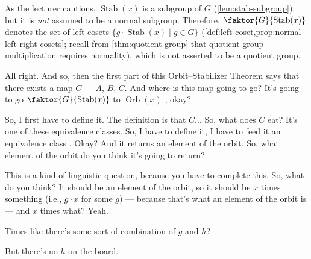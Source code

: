 \begin{insight}
As the lecturer cautions, $\operatorname{Stab}(x)$ is a subgroup of $G$ (\cref{lem:stab-subgroup}), but it is \emph{not} assumed to be a normal subgroup. Therefore, $\faktor{G}{\operatorname{Stab}(x)}$ denotes the set of left cosets $\{ g \cdot \operatorname{Stab}(x) \mid g \in G \}$ (\cref{def:left-coset,prop:normal-left-right-cosets}; recall from \cref{thm:quotient-group} that quotient group multiplication requires normality), which is not asserted to be a quotient group.
\end{insight}

\begin{speech}[00:24:49 - 00:25:53]
All right. And so, then the first part of this Orbit--Stabilizer Theorem says that there exists a map $C$  --- $A$, $B$, $C$. And where is this map going to go? It's going to go $\faktor{G}{\operatorname{Stab}(x)}$ to $\operatorname{Orb}(x)$ , okay?

So, I first have to define it. The definition is that $C$...  So, what does $C$ eat? It's one of these equivalence classes. So, I have to define it, I have to feed it an equivalence class . Okay? And it returns an element of the orbit. So, what element of the orbit do you think it's going to return?

This is a kind of linguistic question, because you have to complete this. So, what do you think? It should be an element of the orbit, so it should be $x$ times something (i.e., $g \cdot x$ for some $g$) --- because that's what an element of the orbit is --- and $x$ times what? Yeah.
\end{speech}

\begin{student}
Times like there's some sort of combination of $g$ and $h$?
\end{student}

\begin{speech}[00:25:56 - 00:25:58]
But there's no $h$ on the board.
\end{speech}

